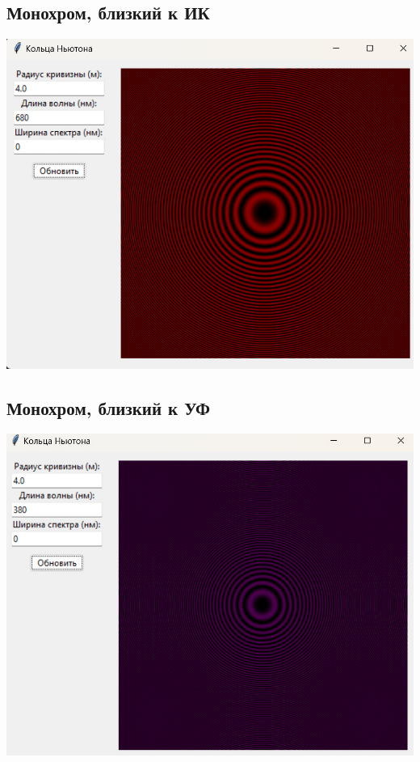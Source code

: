 \documentclass[a4paper,11pt]{article}
\theoremstyle{definition}
\begin{document}
    \subsection{Монохром, близкий к ИК}
    \includegraphics[scale=0.7]{3. Newton's rings/demo results/infraRed_mono}

    \subsection{Монохром, близкий к УФ}
    \includegraphics[scale=0.7]{3. Newton's rings/demo results/ultraViolet_mono}
\end{document}
